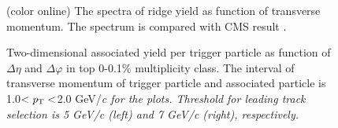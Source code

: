 \begin{figure}
	\centering
	\caption{(color online) The spectra of ridge yield as function of transverse momentum. The spectrum is compared with CMS result \cite{ridge_pp_1}.}
\end{figure}


\begin{figure}
	\centering
	\caption{ Two-dimensional associated yield per trigger particle as function of $\Delta\eta$ and $\Delta\varphi$ in top 0-0.1\% multiplicity class. The interval of transverse momentum of trigger particle and associated particle is 1.0$<\it{p}_{\rm{T}}<$2.0 GeV/\it{c}\rm{} for the plots. Threshold for leading track selection is 5 GeV/\it{c}\rm{} (left) and 7 GeV/\it{c}\rm{} (right), respectively. }
\end{figure}


